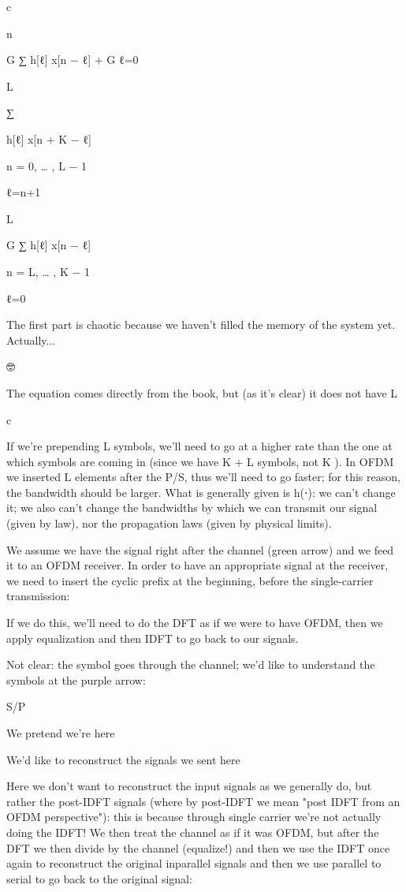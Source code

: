 {c

n

\sqrt G ∑ h[ℓ] x[n − ℓ] + \sqrt G ℓ=0

L

∑

h[ℓ] x[n + K − ℓ]

n = 0, … , L − 1

ℓ=n+1

L

\sqrt G ∑ h[ℓ] x[n − ℓ]

n = L, … , K − 1

ℓ=0

The first part is chaotic because we haven't filled the memory of the system yet.
​Actually...

🤓

The equation comes directly from the book, but (as it's clear) it does not have L

c

If we're prepending L symbols, we'll need to go at a higher rate than the one at which symbols are coming in (since we have K + L symbols, not K ).
In OFDM we inserted L elements after the P/S, thus we'll need to go faster; for this reason, the bandwidth should be larger.
What is generally given is h(⋅): we can't change it; we also can't change the bandwidths by which we can transmit our signal (given by law), nor the propagation laws (given by physical limits).

We assume we have the signal right after the channel (green arrow) and we feed it to an OFDM receiver. In order to have an appropriate signal at the receiver, we need to insert the cyclic prefix at the beginning, before the single-carrier transmission:

If we do this, we'll need to do the DFT as if we were to have OFDM, then we apply equalization and then IDFT to go back to our signals.

Not clear: the symbol goes through the channel; we'd like to understand the symbols at the purple arrow:

S/P

We pretend we're here

We'd like to reconstruct the signals we sent here

Here we don't want to reconstruct the input signals as we generally do, but rather the post-IDFT signals (where by post-IDFT we mean "post IDFT from an OFDM perspective"):
this is because through single carrier we're not actually doing the IDFT!
We then treat the channel as if it was OFDM, but after the DFT we then divide by the channel (equalize!) and then we use the IDFT once again to reconstruct the original inparallel signals and then we use parallel to serial to go back to the original signal:

}

